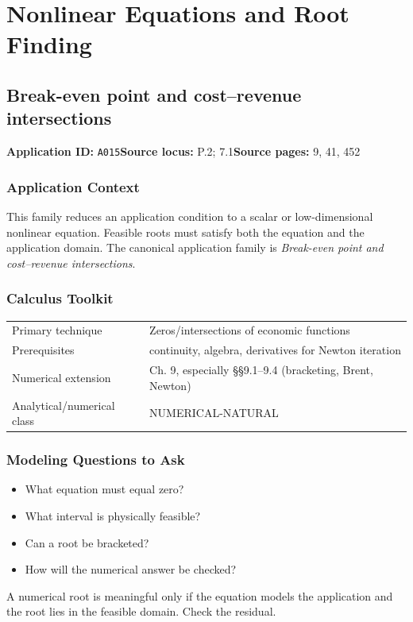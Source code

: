 \documentclass[11pt]{book}
\newcommand{\pid}[1]{\texttt{#1}}
\begin{document}
\part{Nonlinear Equations and Root Finding}
\chapter{Break-even point and cost–revenue intersections}\label{app:A015}
\textbf{Application ID:} \pid{A015}\quad \textbf{Source locus:} P.2; 7.1\quad \textbf{Source pages:} 9, 41, 452
\section*{Application Context}
This family reduces an application condition to a scalar or low-dimensional nonlinear equation. Feasible roots must satisfy both the equation and the application domain. The canonical application family is \emph{Break-even point and cost–revenue intersections}.
\section*{Calculus Toolkit}
\begin{tabularx}{\textwidth}{@{}lX@{}}\toprule
Primary technique & Zeros/intersections of economic functions \\
Prerequisites & continuity, algebra, derivatives for Newton iteration \\
Numerical extension & Ch. 9, especially §§9.1–9.4 (bracketing, Brent, Newton) \\
Analytical/numerical class & NUMERICAL-NATURAL \\
\bottomrule\end{tabularx}
\section*{Modeling Questions to Ask}\begin{itemize}
\item What equation must equal zero?
\item What interval is physically feasible?
\item Can a root be bracketed?
\item How will the numerical answer be checked?
\end{itemize}
\begin{errorbox}A numerical root is meaningful only if the equation models the application and the root lies in the feasible domain. Check the residual.\end{errorbox}
\end{document}
